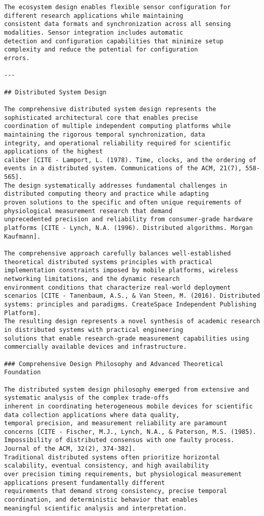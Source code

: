 \documentclass[12pt,a4paper]{report}
\begin{document}
\begin{verbatim}
The ecosystem design enables flexible sensor configuration for different research applications while maintaining
consistent data formats and synchronization across all sensing modalities. Sensor integration includes automatic
detection and configuration capabilities that minimize setup complexity and reduce the potential for configuration
errors.

---

## Distributed System Design

The comprehensive distributed system design represents the sophisticated architectural core that enables precise
coordination of multiple independent computing platforms while maintaining the rigorous temporal synchronization, data
integrity, and operational reliability required for scientific applications of the highest
caliber [CITE - Lamport, L. (1978). Time, clocks, and the ordering of events in a distributed system. Communications of the ACM, 21(7), 558-565].
The design systematically addresses fundamental challenges in distributed computing theory and practice while adapting
proven solutions to the specific and often unique requirements of physiological measurement research that demand
unprecedented precision and reliability from consumer-grade hardware
platforms [CITE - Lynch, N.A. (1996). Distributed algorithms. Morgan Kaufmann].

The comprehensive approach carefully balances well-established theoretical distributed systems principles with practical
implementation constraints imposed by mobile platforms, wireless networking limitations, and the dynamic research
environment conditions that characterize real-world deployment
scenarios [CITE - Tanenbaum, A.S., & Van Steen, M. (2016). Distributed systems: principles and paradigms. CreateSpace Independent Publishing Platform].
The resulting design represents a novel synthesis of academic research in distributed systems with practical engineering
solutions that enable research-grade measurement capabilities using commercially available devices and infrastructure.

### Comprehensive Design Philosophy and Advanced Theoretical Foundation

The distributed system design philosophy emerged from extensive and systematic analysis of the complex trade-offs
inherent in coordinating heterogeneous mobile devices for scientific data collection applications where data quality,
temporal precision, and measurement reliability are paramount
concerns [CITE - Fischer, M.J., Lynch, N.A., & Paterson, M.S. (1985). Impossibility of distributed consensus with one faulty process. Journal of the ACM, 32(2), 374-382].
Traditional distributed systems often prioritize horizontal scalability, eventual consistency, and high availability
over precision timing requirements, but physiological measurement applications present fundamentally different
requirements that demand strong consistency, precise temporal coordination, and deterministic behavior that enables
meaningful scientific analysis and interpretation.


\end{verbatim}
\end{document}
